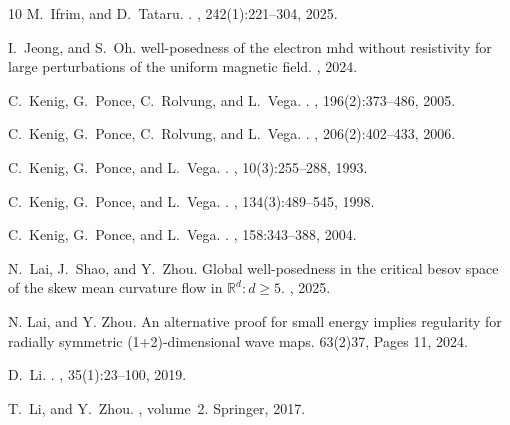 \documentclass[10pt,twoside,a4paper]{article}
\numberwithin{equation}{section}\allowdisplaybreaks
\def\geq{\geqslant}
\begin{document}
\begin{center}
\begin{thebibliography}{10}
		M.~Ifrim, and D.~Tataru.
		.
		, 242(1):221--304, 2025.
		
		I.~Jeong, and S.~Oh.
		\newblock well-posedness of the electron mhd without resistivity for large
		perturbations of the uniform magnetic field.
		, 2024.
		
		C.~Kenig, G.~Ponce, C.~Rolvung, and L.~Vega.
		.
		, 196(2):373--486, 2005.
		
		C.~Kenig, G.~Ponce, C.~Rolvung, and L.~Vega.
		.
		, 206(2):402--433, 2006.
		
		C.~Kenig, G.~Ponce, and L.~Vega.
		.
		, 10(3):255--288, 1993.
		
		C.~Kenig, G.~Ponce, and L.~Vega.
		.
		, 134(3):489--545, 1998.
		
		C.~Kenig, G.~Ponce, and L.~Vega.
		.
		, 158:343--388, 2004.
		
		N.~Lai, J.~Shao, and Y.~Zhou.
		\newblock Global well-posedness in the critical besov space of the skew mean
		curvature flow in $ \mathbb{R}^d:d\geq 5 $.
		, 2025.

	N. Lai, and Y. Zhou.
 \newblock An alternative proof for small energy implies regularity for radially symmetric (1+2)-dimensional wave maps.
  63(2)37, Pages 11, 2024. 
  
		D.~Li.
		.
		, 35(1):23--100, 2019.
		
		T.~Li, and Y.~Zhou.
		, volume~2.
		\newblock Springer, 2017.
		

\end{thebibliography}
\end{center}
\end{document}
